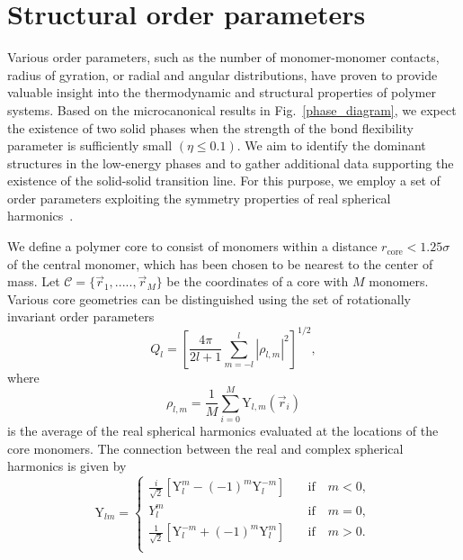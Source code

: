 \documentclass[12pt]{report}
\begin{document}
\section{Structural order parameters}
Various order parameters, such as the number of monomer-monomer
contacts, radius of gyration, or radial and angular distributions, have
proven to provide valuable insight into the thermodynamic and structural
properties of polymer systems. Based on the microcanonical results in
Fig.~\ref{phase_diagram}, we expect the existence of two solid phases
when the strength of the bond flexibility parameter is sufficiently small
$(\eta \leq 0.1)$. We aim to identify the dominant structures in the
low-energy phases and to gather additional data supporting the existence of
the
solid-solid transition line. For this purpose, we employ a set of order
parameters exploiting the symmetry properties of real spherical
harmonics~\cite{Neirotti2000}.

We define a polymer core to consist of monomers within a
distance $r_{\mathrm{core}} < 1.25\sigma$ of the central monomer, which has
been chosen to be nearest to the center of mass. Let $\mathcal{C} = \lbrace
\vec{r}_{1},.....,\vec{r}_{M} \rbrace $ be the coordinates of a core with
$M$ monomers. Various core geometries can be distinguished using the set of
rotationally invariant order parameters
%
\begin{equation}
Q_{l} =  \left[ \frac{4\pi}{2l + 1} \displaystyle\sum_{m =-l}^{l}
|\rho_{l,m}|^{2} \right]^{1/2},	
\end{equation}
%
where 
\begin{equation}
\rho _{l,m} = \frac{1}{M}\sum _{i = 0} ^{M} \mathrm{Y}_{l,m}(\vec{r}_{i})
\label{eq:15}
\end{equation}
%
is the average of the real spherical harmonics evaluated at the locations
of the core monomers. The connection between the real and complex spherical
harmonics is given by
% 
\begin{equation}
	\mathrm{Y}_{lm} =  \left\{
		\begin{array}{lr}
		\frac{i}{\sqrt{2}}\left[\mathrm{Y}_{l}^{m} -
(-1)^{m}\mathrm{Y}_{l}^{-m}\right] & \quad \mathrm{if} \quad  m < 0,
\\[1.5ex]
		{Y}_{l}^{m} & \quad \mathrm{if} \quad  m = 0, \\[1.5ex]
		\frac{1}{\sqrt{2}}\left[\mathrm{Y}_{l}^{-m} +
(-1)^{m}\mathrm{Y}_{l}^{m}\right] & \quad \mathrm{if} \quad  m > 0. \\
		\end{array}
	\right. 
\end{equation}
\end{document}
